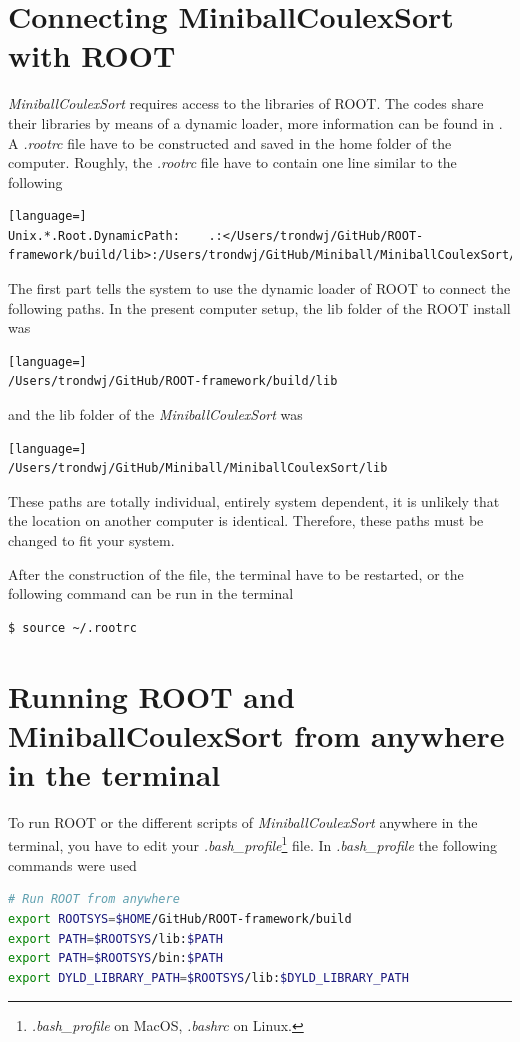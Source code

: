 \documentclass[twoside,english]{uiofysmaster/uiofysmaster}
\begin{document}
\begin{appendices}
\section{Connecting MiniballCoulexSort with ROOT}
\textsl{MiniballCoulexSort} requires access to the libraries of ROOT. 
The codes share their libraries by means of a dynamic loader, more information can be found in \cite{ROOTdynLoader}. 
A \textit{.rootrc} file have to be constructed and saved in the home folder of the computer.
Roughly, the \textit{.rootrc} file have to contain one line similar to the following
\begin{lstlisting}[language=]
Unix.*.Root.DynamicPath:    .:</Users/trondwj/GitHub/ROOT-framework/build/lib>:/Users/trondwj/GitHub/Miniball/MiniballCoulexSort/lib:
\end{lstlisting}
The first part tells the system to use the dynamic loader of ROOT to connect the following paths. 
In the present computer setup, the lib folder of the ROOT install was 
\begin{lstlisting}[language=]
/Users/trondwj/GitHub/ROOT-framework/build/lib
\end{lstlisting}
and the lib folder of the \textsl{MiniballCoulexSort} was
\begin{lstlisting}[language=]
/Users/trondwj/GitHub/Miniball/MiniballCoulexSort/lib
\end{lstlisting}
These paths are totally individual, entirely system dependent, it is unlikely that the location on another computer is identical. 
Therefore, these paths must be changed to fit your system. 

After the construction of the file, the terminal have to be restarted, or the following command can be run in the terminal
\begin{lstlisting}[language=sh]
$ source ~/.rootrc
\end{lstlisting}


\section{Running ROOT and MiniballCoulexSort from anywhere in the terminal}
To run ROOT or the different scripts of \textsl{MiniballCoulexSort} anywhere in the terminal, you have to edit your \textit{.bash\_profile}\footnote{\textit{.bash\_profile} on MacOS, \textit{.bashrc} on Linux.} file. 
In \textit{.bash\_profile} the following commands were used 
\begin{lstlisting}[language=sh]
# Run ROOT from anywhere
export ROOTSYS=$HOME/GitHub/ROOT-framework/build
export PATH=$ROOTSYS/lib:$PATH
export PATH=$ROOTSYS/bin:$PATH
export DYLD_LIBRARY_PATH=$ROOTSYS/lib:$DYLD_LIBRARY_PATH


\end{lstlisting}
\end{appendices}
\end{document}
